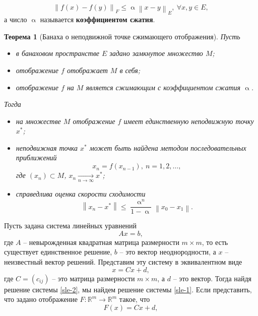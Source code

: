 \documentclass[a4paper, 12pt]{report}
\numberwithin{equation}{section}
\renewcommand{\leq}{\leqslant}
\renewcommand{\alpha}{\upalpha}
\newcommand\Norm[1]{\left\| #1 \right\|}
\newtheorem*{theorem}{Теорема}
\begin{document}
	\begin{equation*}
		\Norm{f(x) - f(y)}_F\leq \alpha \Norm{x - y}_E,\ \forall x ,y \in E,
	\end{equation*}
	а число $\alpha$ называется \textbf{коэффициентом сжатия}.
	\begin{theorem}
		[Банаха о неподвижной точке сжимающего отображения]
		Пусть
		\begin{itemize}
			\item в банаховом пространстве $E$ задано замкнутое множество $M$;
			\item отображение $f$ отображает $M$ в себя;
			\item отображение $f$ на $M$ является сжимающим с коэффициентом сжатия $\alpha$.
		\end{itemize}
		Тогда 
		\begin{itemize}
			\item на множестве $M$ отображение $f$ имеет единственную неподвижную точку $x^*$;
			\item неподвижная точка $x^*$ может быть найдена методом последовательных приближений
			\begin{equation*}
				x_n = f(x_{n-1}),\ n=1,2,\ldots,
			\end{equation*}
			где $(x_n) \subset M$, $x_ n \xrightarrow[n\to\infty]{}x^*$;
			\item справедлива оценка скорости сходимости
			\begin{equation*}
				\Norm{x_n - x^*} \leq \dfrac{\alpha^n}{1 - \alpha} \Norm{x_0 - x_1}.
			\end{equation*}
		\end{itemize}
	\end{theorem}
	Пусть задана система линейных уравнений 
	\begin{equation}
		\label{sle-1}
		Ax = b,
	\end{equation}
	где $A$  -- невырожденная квадратная матрица размерности $m\times m$, то есть существует единственное решение, $b$ -- это вектор неоднородности, а $x$ -- неизвестный вектор решений. Представим эту систему в эквивалентном виде
	\begin{equation}
		\label{sle-2}
		x = Cx + d,
	\end{equation}
	где $C = (c_{ij})$ -- это матрица размерности $m\times m$, а $d$ -- это вектор. Тогда найдя решение системы \eqref{sle-2}, мы найдем решение системы \eqref{sle-1}.  Если представить, что задано отображение $F : \mathbb R^m \to \mathbb R^m$ такое, что
	\begin{equation*}
		F(x) = Cx + d,
	\end{equation*}
\end{document}
